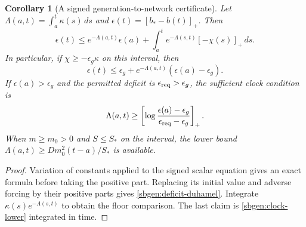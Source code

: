 \documentclass{article} %
\theoremstyle{plain}
\newtheorem{corollary}[theorem]{Corollary}
\theoremstyle{definition}
\theoremstyle{remark}
\begin{document}
\begin{corollary}[A signed generation-to-network certificate]
\label{sbgen:deficit-certificate}
Let $\Lambda(a,t)=\int_a^t\kappa(s)\,ds$ and
$\epsilon(t)=[b_*-b(t)]_+$. Then
\begin{equation}\label{sbgen:deficit-duhamel}
 \epsilon(t)\le e^{-\Lambda(a,t)}\epsilon(a)
       +\int_a^t e^{-\Lambda(s,t)}[-\chi(s)]_+\,ds.
\end{equation}
In particular, if $\chi\ge-\epsilon_g\kappa$ on this interval, then
\[
 \epsilon(t)\le\epsilon_g+
                  e^{-\Lambda(a,t)}(\epsilon(a)-\epsilon_g).
\]
If $\epsilon(a)>\epsilon_g$ and the permitted deficit is
$\epsilon_{\rm req}>\epsilon_g$, the sufficient clock condition is
\[
 \Lambda(a,t)\ge
 \left[\log\frac{\epsilon(a)-\epsilon_g}
                       {\epsilon_{\rm req}-\epsilon_g}\right]_+.
\]
When $m\ge m_0>0$ and $S\le S_*$ on the interval, the lower bound
$\Lambda(a,t)\ge Dm_0^2(t-a)/S_*$ is available.
\end{corollary}
\begin{proof}
Variation of constants applied to the signed scalar equation gives an
exact formula before taking the positive part. Replacing its initial
value and adverse forcing by their positive parts gives
\eqref{sbgen:deficit-duhamel}. Integrate
$\kappa(s)e^{-\Lambda(s,t)}$ to obtain the floor comparison. The last
claim is \eqref{sbgen:clock-lower} integrated in time.
\end{proof}
\end{document}
